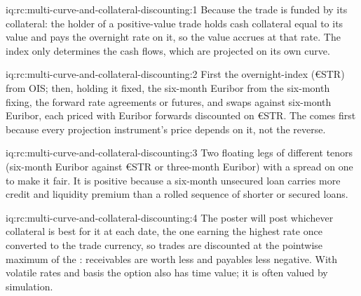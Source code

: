 \begin{solution}{iq:rc:multi-curve-and-collateral-discounting:1}
Because the trade is funded by its collateral: the holder of a positive-value
trade holds cash collateral equal to its value and pays the overnight rate on
it, so the value accrues at that rate. The index only determines the cash flows,
which are projected on its own curve.
\end{solution}

\begin{solution}{iq:rc:multi-curve-and-collateral-discounting:2}
First the overnight-index (€STR)  from OIS; then, holding it
fixed, the six-month Euribor  from the six-month fixing, the
forward rate agreements or futures, and swaps against six-month Euribor, each
priced with Euribor forwards discounted on €STR. The  comes first
because every projection instrument's price depends on it, not the reverse.
\end{solution}

\begin{solution}{iq:rc:multi-curve-and-collateral-discounting:3}
Two floating legs of different tenors (six-month Euribor against €STR or
three-month Euribor) with a spread on one to make it fair. It is positive
because a six-month unsecured loan carries more credit and liquidity premium
than a rolled sequence of shorter or secured loans.
\end{solution}

\begin{solution}{iq:rc:multi-curve-and-collateral-discounting:4}
The poster will post whichever collateral is best for it at each date, the
one earning the highest rate once converted to the trade currency, so trades
are discounted at the pointwise maximum of the : receivables
are worth less and payables less negative. With volatile rates and basis the
option also has time value; it is often valued by simulation.
\end{solution}

